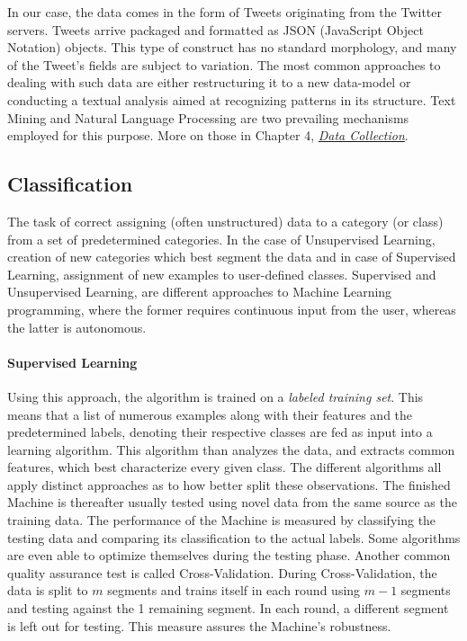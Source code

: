 		\par
		
		In our case, the data comes in the form of Tweets originating from the Twitter servers. Tweets arrive packaged and formatted as JSON (JavaScript Object Notation) objects. This type of construct has no standard morphology, and many of the Tweet's fields are subject to variation. The most common approaches to dealing with such data are either restructuring it to a new data-model or conducting a textual analysis aimed at recognizing patterns in its structure. Text Mining and Natural Language Processing are two prevailing mechanisms employed for this purpose. More on those in Chapter 4, \hyperref[sec:collect_data]{\textit{Data Collection}}.
		
	\subsection{Classification}
		The task of correct assigning (often unstructured) data to a category (or class) from a set of predetermined categories. In the case of Unsupervised Learning, creation of new categories which best segment the data and in case of Supervised Learning, assignment of new examples to user-defined classes. Supervised and Unsupervised Learning, are different approaches to Machine Learning programming, where the former requires continuous input from the user, whereas the latter is autonomous. 
		
		\paragraph{Supervised Learning}
			Using this approach, the algorithm is trained on a \textit{labeled training set}. This means that a list of numerous examples along with their features and the predetermined labels, denoting their respective classes are fed as input into a learning algorithm. This algorithm than analyzes the data, and extracts common features, which best characterize every given class. The different algorithms all apply distinct approaches as to how better split these observations. The finished Machine is thereafter usually tested using novel data from the same source as the training data. The performance of the Machine is measured  by classifying the testing data and comparing its classification to the actual labels. Some algorithms are even able to optimize themselves during the testing phase. Another common quality assurance test is called Cross-Validation. During Cross-Validation, the data is split to $ m $ segments and trains itself in each round using $ m-1 $ segments and testing against the 1 remaining segment. In each round, a different segment is left out for testing. This measure assures the Machine's robustness.
		
